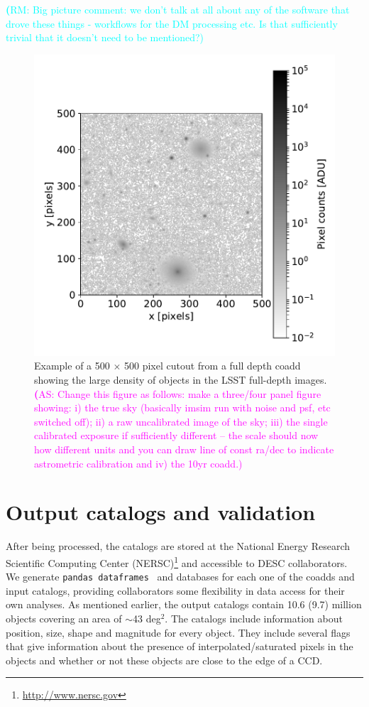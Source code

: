 \documentclass[twocolumn]{aastex62}
\newcommand{\rachel}[1]{{\textcolor{cyan}{{\textbf (RM: #1)}}}}
\newcommand{\as}[1]{{\textcolor{magenta}{{\textbf (AS: #1)}}}}
\begin{document}
\rachel{Big picture comment: we don't talk at all about any of the software that drove these things - workflows for the DM processing etc.  Is that sufficiently trivial that it doesn't need to be mentioned?}

\begin{figure}
\centering
\includegraphics[width=0.9\columnwidth]{sample_coadd_DC1.pdf}
\caption{Example of a 500 $\times$ 500 pixel cutout from a full depth coadd showing the large density of objects in the LSST full-depth images.
\as{Change this figure as follows: make a three/four panel figure showing: i) the true sky (basically imsim run with noise and psf, etc switched off); ii) a raw uncalibrated image of the sky; iii) the single calibrated exposure if sufficiently different -- the scale should now how different units and you can draw line of const ra/dec to indicate astrometric calibration and iv) the 10yr coadd.}}
\label{fig:coadd_example}
\end{figure}

\section{Output catalogs and validation}
\label{sec:catalogs}
After being processed, the catalogs are stored at the National Energy Research Scientific Computing Center (NERSC)\footnote{\url{http://www.nersc.gov}} and accessible to DESC collaborators. We generate \texttt{pandas
dataframes}~\citep{mckinney-proc-scipy-2010} and databases for each one of the coadds and input catalogs, providing collaborators some flexibility in data access for their own analyses. As mentioned earlier, the output catalogs contain 10.6 (9.7) million objects covering an area
of $\sim$43 deg$^{2}$. The catalogs include information about position, size, shape and magnitude for every object. They include several flags that give information about the presence of interpolated/saturated pixels in the objects and whether or not these objects are close to the edge of a CCD.
\end{document}
